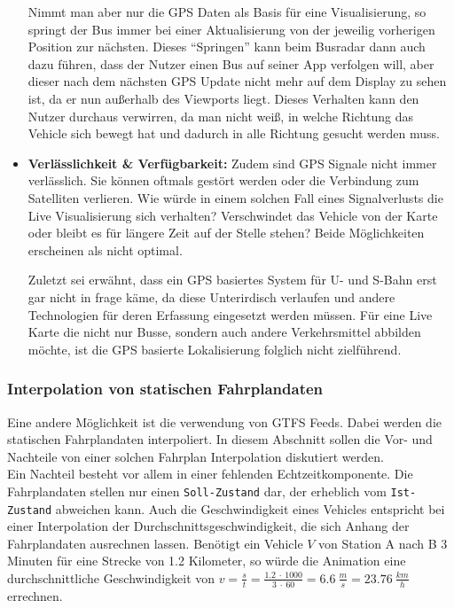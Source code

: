 \begin{itemize}
        Nimmt man aber nur die GPS Daten als Basis für eine Visualisierung, so springt der Bus immer bei einer Aktualisierung von der jeweilig vorherigen Position zur nächsten. Dieses "`Springen"' kann beim Busradar dann auch dazu führen, dass der Nutzer einen Bus auf seiner App verfolgen will, aber dieser nach dem nächsten GPS Update nicht mehr auf dem Display zu sehen ist, da er nun außerhalb des Viewports liegt. Dieses Verhalten kann den Nutzer durchaus verwirren, da man nicht weiß, in welche Richtung das Vehicle sich bewegt hat und dadurch in alle Richtung gesucht werden muss.

      \item \textbf{Verlässlichkeit \& Verfügbarkeit:} 
        Zudem sind GPS Signale nicht immer verlässlich. Sie können oftmals gestört werden oder die Verbindung zum Satelliten verlieren. Wie würde in einem solchen Fall eines Signalverlusts die Live Visualisierung sich verhalten? Verschwindet das Vehicle von der Karte oder bleibt es für längere Zeit auf der Stelle stehen? Beide Möglichkeiten erscheinen als nicht optimal. 

        Zuletzt sei erwähnt, dass ein GPS basiertes System für U- und S-Bahn erst gar nicht in frage käme, da diese Unterirdisch verlaufen und andere Technologien für deren Erfassung eingesetzt werden müssen. Für eine Live Karte die nicht nur Busse, sondern auch andere Verkehrsmittel abbilden möchte, ist die GPS basierte Lokalisierung folglich nicht zielführend.
    \end{itemize} 


    \subsubsection{Interpolation von statischen Fahrplandaten}
    \label{ssub:interpolation_von_statischen_fahrplandaten}
      Eine andere Möglichkeit ist die verwendung von GTFS Feeds. Dabei werden die statischen Fahrplandaten interpoliert. In diesem Abschnitt sollen die Vor- und Nachteile von einer solchen Fahrplan Interpolation diskutiert werden.\\

      Ein Nachteil besteht vor allem in einer fehlenden Echtzeitkomponente. Die Fahrplandaten stellen nur einen \texttt{Soll-Zustand} dar, der erheblich vom \texttt{Ist-Zustand} abweichen kann. Auch die Geschwindigkeit eines Vehicles entspricht bei einer Interpolation der Durchschnittsgeschwindigkeit, die sich Anhang der Fahrplandaten ausrechnen lassen. Benötigt ein Vehicle $V$ von Station A nach B 3 Minuten für eine Strecke von 1.2 Kilometer, so würde die Animation eine durchschnittliche Geschwindigkeit von $v = \frac{s}{t} = \frac{1.2 \: \cdot \: 1000}{3 \: \cdot \: 60} = 6.6 \: \frac{m}{s} = 23.76 \: \frac{km}{h}$ errechnen.

